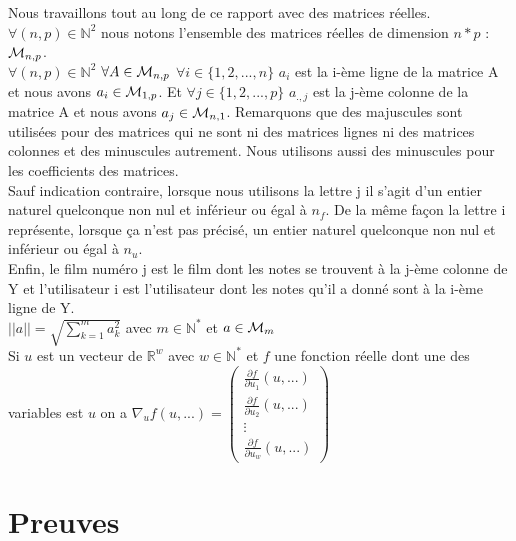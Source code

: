 \documentclass[a4paper,10pt]{article}
\begin{document}
Nous travaillons tout au long de ce rapport avec des matrices réelles. $\forall (n, p) \in \mathbb{N}^2$ nous notons l'ensemble des matrices réelles de dimension $n * p$ : ${\cal M}_{n, p}$.\\ 
$\forall (n, p) \in \mathbb{N}^2$ $\forall A \in {\cal M}_{n, p}$ $\forall i \in \{1, 2, ..., n\}$ $a_i$ est la i-ème ligne de la matrice A et nous avons $a_i \in {\cal M}_{1, p}$. Et $\forall j \in \{1, 2, ..., p\}$ $a_{., j}$ est la j-ème colonne de la matrice A et nous avons $a_j \in {\cal M}_{n, 1}$. Remarquons que des majuscules sont utilisées pour des matrices qui ne sont ni des matrices lignes ni des matrices colonnes et des minuscules autrement. Nous utilisons aussi des minuscules pour les coefficients des matrices.\\ 
Sauf indication contraire, lorsque nous utilisons la lettre j il s'agit d'un entier naturel quelconque non nul et inférieur ou égal à $n_f$. De la même façon la lettre i représente, lorsque ça n'est pas précisé, un entier naturel quelconque non nul et inférieur ou égal à $n_u$.\\ 
Enfin, le film numéro j est le film dont les notes se trouvent à la j-ème colonne de Y et l'utilisateur i est l'utilisateur dont les notes qu'il a donné sont à la i-ème ligne de Y.\\

$||a|| = \sqrt{\sum_{k = 1}^{m} a_{k}^{2}}$ avec $m \in \mathbb{N}^*$ et $a \in {\cal M}_{m}$\\

Si $u$ est un vecteur de $\mathbb{R}^w$ avec $w \in \mathbb{N}^*$ et $f$ une fonction réelle dont une des variables est $u$ on a 
$\nabla_{u} f(u, ...) =
\begin{pmatrix}
\frac{\partial f}{\partial u_{1}}(u, ...)\\
\frac{\partial f}{\partial u_{2}}(u, ...)\\
\vdots\\
\frac{\partial f}{\partial u_{w}}(u, ...)
\end{pmatrix}$

\section{Preuves}
\end{document}
